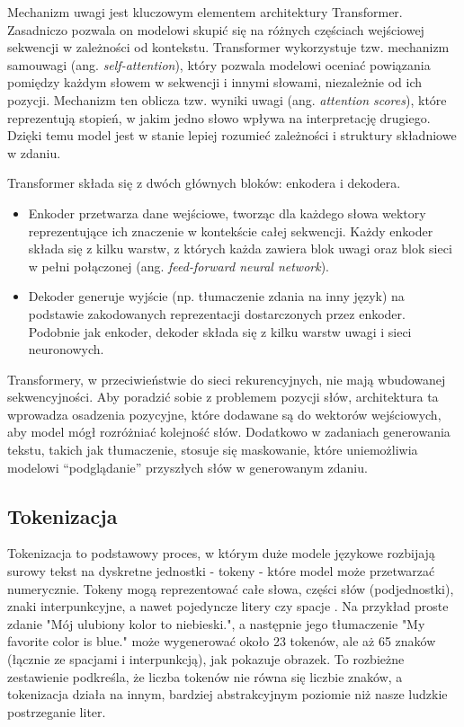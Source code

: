 Mechanizm uwagi jest kluczowym elementem architektury Transformer. Zasadniczo pozwala on modelowi skupić się na różnych częściach wejściowej sekwencji w zależności od kontekstu. Transformer wykorzystuje tzw. mechanizm samouwagi (ang. \textit{self-attention}), który pozwala modelowi oceniać powiązania pomiędzy każdym słowem w sekwencji i innymi słowami, niezależnie od ich pozycji. Mechanizm ten oblicza tzw. wyniki uwagi (ang. \textit{attention scores}), które reprezentują stopień, w jakim jedno słowo wpływa na interpretację drugiego. Dzięki temu model jest w stanie lepiej rozumieć zależności i struktury składniowe w zdaniu.

Transformer składa się z dwóch głównych bloków: enkodera i dekodera.
\begin{itemize}
  \item Enkoder przetwarza dane wejściowe, tworząc dla każdego słowa wektory reprezentujące ich znaczenie w kontekście całej sekwencji. Każdy enkoder składa się z kilku warstw, z których każda zawiera blok uwagi oraz blok sieci w pełni połączonej (ang. \textit{feed-forward neural network}).
  \item Dekoder generuje wyjście (np. tłumaczenie zdania na inny język) na podstawie zakodowanych reprezentacji dostarczonych przez enkoder. Podobnie jak enkoder, dekoder składa się z kilku warstw uwagi i sieci neuronowych.
\end{itemize}

Transformery, w przeciwieństwie do sieci rekurencyjnych, nie mają wbudowanej sekwencyjności. Aby poradzić sobie z problemem pozycji słów, architektura ta wprowadza osadzenia pozycyjne, które dodawane są do wektorów wejściowych, aby model mógł rozróżniać kolejność słów. Dodatkowo w zadaniach generowania tekstu, takich jak tłumaczenie, stosuje się maskowanie, które uniemożliwia modelowi “podglądanie” przyszłych słów w generowanym zdaniu.

\subsection{Tokenizacja}
Tokenizacja to podstawowy proces, w którym duże modele językowe rozbijają surowy tekst na dyskretne jednostki - tokeny - które model może przetwarzać numerycznie. Tokeny mogą reprezentować całe słowa, części słów (podjednostki), znaki interpunkcyjne, a nawet pojedyncze litery czy spacje \cite{tokenization-lxt}. Na przykład proste zdanie "Mój ulubiony kolor to niebieski.", a następnie jego tłumaczenie "My favorite color is blue." może wygenerować około 23 tokenów, ale aż 65 znaków (łącznie ze spacjami i interpunkcją), jak pokazuje obrazek. To rozbieżne zestawienie podkreśla, że liczba tokenów nie równa się liczbie znaków, a tokenizacja działa na innym, bardziej abstrakcyjnym poziomie niż nasze ludzkie postrzeganie liter.


